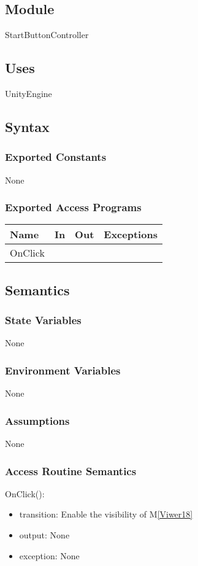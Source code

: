 \documentclass[12pt, titlepage]{article}
\newcommand{\mref}[1]{M\ref{#1}}
\begin{document}
\subsection{Module}
StartButtonController
\subsection{Uses}
UnityEngine
\subsection{Syntax}

\subsubsection{Exported Constants}
None
\subsubsection{Exported Access Programs}
\begin{center}
\begin{tabular}{|p{3cm}|p{4cm}|p{4cm}| p{5cm}|}
\hline
\textbf{Name} & \textbf{In} & \textbf{Out} & \textbf{Exceptions} \\
\hline
 OnClick& &  & \\
\hline
\end{tabular}
\end{center}
\subsection{Semantics}
\subsubsection{State Variables}
None

\subsubsection{Environment Variables}
None

\subsubsection{Assumptions}
None

\subsubsection{Access Routine Semantics}
OnClick():
\begin{itemize}
    \item transition: Enable the visibility of \mref{Viwer18} 
    \item output: None
    \item exception: None
\end{itemize}
\end{document}
